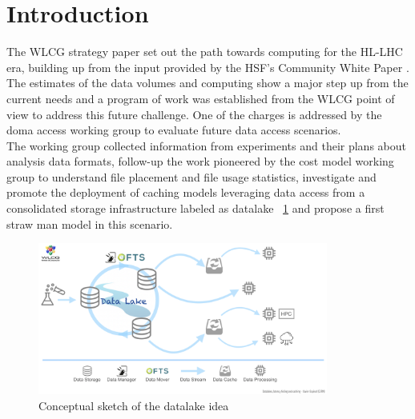 \section{Introduction}
The WLCG \cite{wlcg} strategy paper set out the path towards computing for the HL-LHC era, building up from the input provided by the HSF's \cite{hsf} Community White Paper \cite{cwp}.
The estimates of the data volumes and computing show a major step up from the current needs and a program of work was established from the WLCG point of view to address this future challenge. One of the charges is addressed by the doma access working group to evaluate future data access scenarios.\\
The working group collected information from experiments and their plans about analysis data formats, follow-up the work pioneered by the cost model working group to understand file placement and file usage statistics, investigate and promote the deployment of caching models leveraging data access from a consolidated storage infrastructure labeled as datalake ~\ref{datalake-sketch-horizontal} and propose a first straw man model in this scenario.

\begin{figure}[h]
  \centering
  \includegraphics[height=5cm]{Datalake-sketch-horizontal.png}
  \caption{{\em} Conceptual sketch of the datalake idea}
  \label{datalake-sketch-horizontal}
\end{figure}



